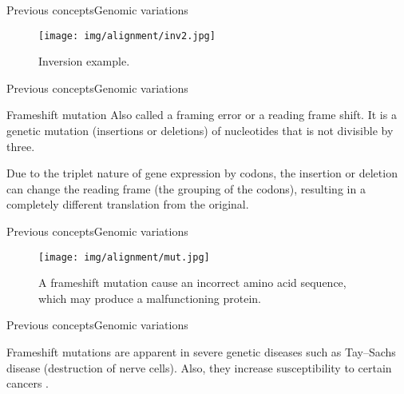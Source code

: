\documentclass[10pt]{beamer}
\newcommand{\1}{
	\setbeamertemplate{background}{
		\texttt{[image: img/1]}
		\tikz[overlay] \fill[fill opacity=0.75,fill=white] (0,0) rectangle (-\paperwidth,\paperheight);
	}
}
\begin{document}
\begin{frame}{Previous concepts}{Genomic variations}
	\begin{figure}[]
		\centering
		\texttt{[image: img/alignment/inv2.jpg]}
		\label{img:alig}
		\caption{Inversion example.}
	\end{figure}
\end{frame}

\begin{frame}{Previous concepts}{Genomic variations}
	\begin{block}{Frameshift mutation}
	Also called a framing error or a reading frame shift. It is a genetic mutation (insertions or deletions) of nucleotides that is not divisible by three. 
	\end{block}
	\pause
	\begin{block}{}
	Due to the triplet nature of gene expression by codons, the insertion or deletion can change the reading frame (the grouping of the codons), resulting in a completely different translation from the original.
	\end{block}
\end{frame}

\begin{frame}{Previous concepts}{Genomic variations}
	\begin{figure}[]
		\centering
		\texttt{[image: img/alignment/mut.jpg]}
		\label{img:alig}
		\caption{A frameshift mutation cause an incorrect amino acid sequence, which may produce a malfunctioning protein.}
	\end{figure}
\end{frame}

\begin{frame}{Previous concepts}{Genomic variations}
	\begin{block}{}
		Frameshift mutations are apparent in severe genetic diseases such as Tay–Sachs disease (destruction of nerve cells). Also, they increase susceptibility to certain cancers \cite{zimmerman1997inherited}.
	\end{block}
	
\end{frame}
\end{document}
